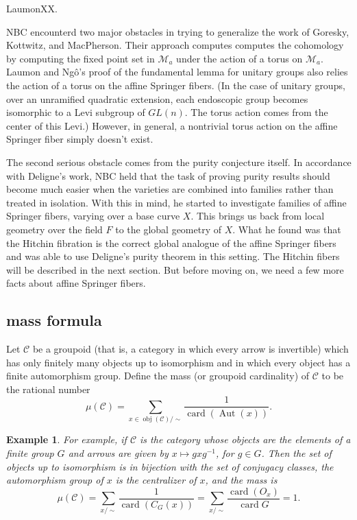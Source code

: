 \documentclass[brochure,english,12pt]{bourbaki}
\newtheorem{example}[equation]{Example}
\def\op#1{{\operatorname{#1}}}
\def\card{\op{card}}
\def\C{{\mathcal C}}
\def\M{{\mathcal M}}
\begin{document}
LaumonXX.

NBC encounterd two major obstacles in trying to generalize the work of
Goresky, Kottwitz, and MacPherson.  Their approach computes computes
the cohomology by computing the fixed point set in $\M_a$ under the
action of a torus on $\M_a$.  Laumon and Ng\^o's proof of the
fundamental lemma for unitary groups also relies the action of a torus
on the affine Springer fibers.  (In the case of unitary groups, over
an unramified quadratic extension, each endoscopic group becomes
isomorphic to a Levi subgroup of $GL(n)$.  The torus action comes from
the center of this Levi.)  However, in general, a nontrivial torus
action on the affine Springer fiber simply doesn't exist.

The second serious obstacle comes from the purity conjecture itself.
In accordance with Deligne's work, NBC held that the task of proving
purity results should become much easier when the varieties are
combined into families rather than treated in isolation.  With this in
mind, he started to investigate families of affine Springer fibers,
varying over a base curve $X$.  This brings us back from local
geometry over the field $F$ to the global geometry of $X$.  What he
found was that the Hitchin fibration is the correct global analogue of
the affine Springer fibers and was able to use Deligne's  purity theorem in this setting.  
The Hitchin fibers will be described in
the next section.  But before moving on, we need a few more facts
about affine Springer fibers.

\subsection{mass formula}

Let ${\C}$ be a groupoid (that is, a category in which every arrow is
invertible) which has only finitely many objects up to isomorphism and
in which every object has a finite automorphism group.  Define the
mass (or groupoid cardinality) of $\C$  to be the rational
number
\[
\mu(\C)= \sum_{x\in \op{obj}(\C)/\sim} \frac{1}{\op{card}(\op{Aut}(x))}.
\]

\begin{example}
For example, if ${\C}$ is the category whose objects are the elements of a finite group $G$
and arrows are given by $x \mapsto g x g^{-1}$, for $g\in G$.  Then the set of objects up to
isomorphism is in bijection with the set of conjugacy classes, the automorphism group of $x$ is the
centralizer of $x$,  and the mass is
\[
\mu(\C) = \sum_{x/\sim} \frac{1}{\op{card}(C_G(x))} = 
\sum_{x/\sim} \frac{\op{card}(O_x)}{\card{G}} = 1.
\]
\end{example}
\end{document}
